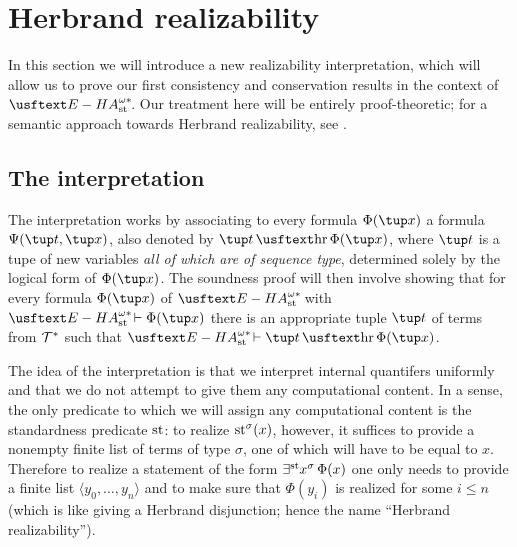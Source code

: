 \section{Herbrand realizability}

In this section we will introduce a new realizability interpretation, which will allow us to prove our first consistency and conservation results in the context of $\ehaststar$. Our treatment here will be entirely proof-theoretic; for a semantic approach towards Herbrand realizability, see \cite{berg12}.

\subsection{The interpretation}

The interpretation works by associating to every formula $\Phi(\tup x)$ a formula $\Psi(\tup t,\tup x)$, also denoted by $\tup t \hr \Phi(\tup x)$, where $\tup t$ is a tupe of new variables \emph{all of which are of sequence type}, determined solely by the logical form of $\Phi(\tup x)$. The soundness proof will then involve showing that for every formula $\Phi(\tup x)$ of $\ehaststar$ with $\ehaststar \vdash \Phi(\tup x)$ there is an appropriate tuple $\tup t$ of terms from $\mathcal{T}^*$ such that $\ehaststar \vdash \tup t \hr \Phi(\tup x)$.

The idea of the interpretation is that we interpret internal quantifers uniformly and that we do not attempt to give them any computational content. In a sense, the only predicate to which we will assign any computational content is the standardness predicate $\operatorname{st}$: to realize $\operatorname{st}^\sigma(x)$, however, it suffices to provide a nonempty finite list of terms of type $\sigma$, one of which will have to be equal to $x$. Therefore to realize a statement of the form $\exists^{\operatorname{st}{}}\! x^\sigma \, \Phi(x)$ one only needs to provide a finite list $\langle y_0, \ldots, y_n \rangle$ and to make sure that $\Phi(y_i)$ is realized for some $i \leq n$ (which is like giving a Herbrand disjunction; hence the name ``Herbrand realizability'').

